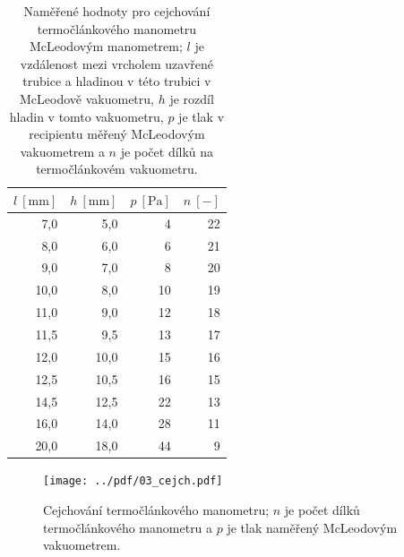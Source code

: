 \documentclass[english]{article}
\newcommand{\unit}[1]{\mathrm{#1}}
\begin{document}
\begin{table}[h!]
	\centering
	\begin{tabular}{|r|r|r|r|}
		\hline
		$l~\unit{[mm]}$ & $h~\unit{[mm]}$ & $p~\unit{[Pa]}$ & $n~\unit{[-]}$ \bigstrut\\
		\hline
		7,0   & 5,0   & 4     & 22 \bigstrut\\
		\hline
		8,0   & 6,0   & 6     & 21 \bigstrut\\
		\hline
		9,0   & 7,0   & 8     & 20 \bigstrut\\
		\hline
		10,0  & 8,0   & 10    & 19 \bigstrut\\
		\hline
		11,0  & 9,0   & 12    & 18 \bigstrut\\
		\hline
		11,5  & 9,5   & 13    & 17 \bigstrut\\
		\hline
		12,0  & 10,0  & 15    & 16 \bigstrut\\
		\hline
		12,5  & 10,5  & 16    & 15 \bigstrut\\
		\hline
		14,5  & 12,5  & 22    & 13 \bigstrut\\
		\hline
		16,0  & 14,0  & 28    & 11 \bigstrut\\
		\hline
		20,0  & 18,0  & 44    & 9 \bigstrut\\
		\hline
	\end{tabular}%
	
	
	\caption{Naměřené hodnoty pro cejchování termočlánkového manometru McLeodovým manometrem; $ l $ je vzdálenost mezi vrcholem uzavřené trubice a hladinou v této trubici v McLeodově vakuometru, $ h $ je rozdíl hladin v tomto vakuometru, $ p $ je tlak v recipientu měřený McLeodovým vakuometrem a $n$ je počet dílků na termočlánkovém vakuometru.}
	\label{tab:cejchovani}
	
\end{table}

\begin{figure}[h!]
	\begin{center}
		\vspace*{-2cm}
		\texttt{[image: ../pdf/03\_cejch.pdf]}
		\vspace*{-0,7cm}
		\caption{Cejchování termočlánkového manometru; $ n $ je počet dílků termočlánkového manometru a $ p $ je tlak naměřený McLeodovým vakuometrem.}
		\label{graf_cejchovani}
	\end{center}
\end{figure}
\end{document}
